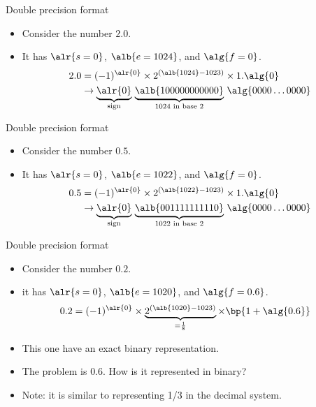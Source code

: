 \documentclass[11pt,xcolor={dvipsnames},aspectratio=159,hyperref={pdftex,pdfpagemode=UseNone,hidelinks,pdfdisplaydoctitle=true},usepdftitle=false]{beamer}
\begin{document}
\begin{frame}{Double precision format}
    \begin{itemize}
    
        \item Consider the number $2.0$.
        \item It has $\alr{s = 0}$, $\alb{e = 1024}$, and $\alg{f = 0}$.
       \begin{align*}
            2.0 & = (-1)^{\alr{0}} \times 2^{(\alb{1024} -1023)} \times 1. \alg{0}   \\
                & \rightarrow \underbrace{\alr{0}}_{\text{sign}}\, \underbrace{\alb{1000 0000 0000}}_{1024 \text{ in base 2}}\, \alg{0000 \ldots 0000}
        \end{align*}
    \end{itemize}
    
\end{frame}

\begin{frame}{Double precision format}
    \begin{itemize}
    
        \item Consider the number $0.5$.
        \item It has $\alr{s = 0}$, $\alb{e = 1022}$, and $\alg{f = 0}$.
       \begin{align*}
            0.5 & = (-1)^{\alr{0}} \times 2^{(\alb{1022} -1023)} \times 1.\alg{0}   \\
                & \rightarrow \underbrace{\alr{0}}_{\text{sign}}\, \underbrace{\alb{0011 1111 1110}}_{1022 \text{ in base 2}}\, \alg{0000 \ldots 0000}
        \end{align*}
    \end{itemize}
    
\end{frame}

\begin{frame}{Double precision format}
    \begin{itemize}
    
        \item Consider the number $0.2$.
        \item it has $\alr{s = 0}$, $\alb{e = 1020}$, and $\alg{f = 0.6}$.
       \begin{align*}
            0.2 & = (-1)^{\alr{0}} \times \underbrace{ 2^{(\alb{1020} -1023)}}_{=\frac{1}{8}} \times \bp{1+\alg{0.6}}  
        \end{align*}
        \item This one  have an exact binary representation.
        \item The problem is $0.6$. How is it represented in binary?
        \item Note: it is similar to representing 1/3 in the decimal system. 
    \end{itemize}
    
\end{frame}
\end{document}

